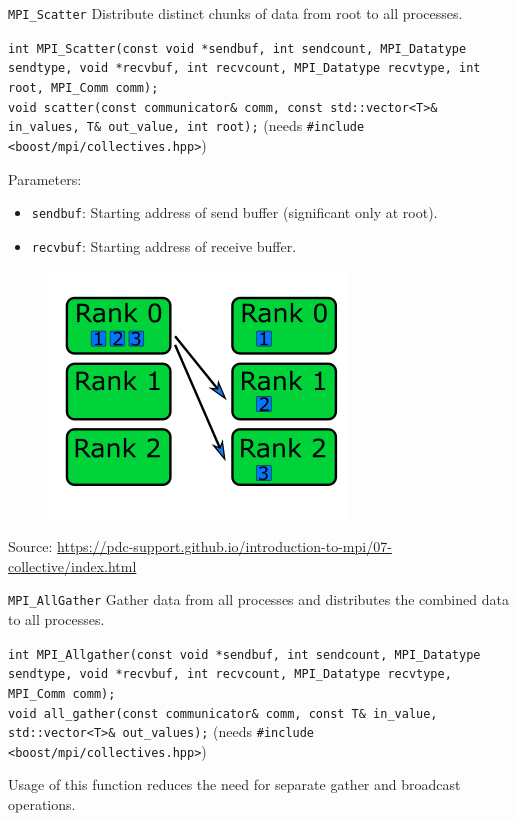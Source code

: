 \documentclass{beamer}
\begin{document}
\begin{frame}{\texttt{MPI\_Scatter}}
  Distribute distinct chunks of data from root to all processes.

  {
    \footnotesize
    \texttt{int MPI\_Scatter(const void *sendbuf, int sendcount, MPI\_Datatype sendtype, void *recvbuf, int recvcount, MPI\_Datatype recvtype, int root, MPI\_Comm comm);} \\
    \texttt{void scatter(const communicator\& comm, const std::vector<T>\& in\_values, T\& out\_value, int root);} (needs \texttt{\#include <boost/mpi/collectives.hpp>})
  }

  \begin{minipage}[t]{0.6\textwidth}
    Parameters:
    \begin{itemize}
      \item \texttt{sendbuf}: Starting address of send buffer (significant only at root).
      \item \texttt{recvbuf}: Starting address of receive buffer.
    \end{itemize}
  \end{minipage}
  \hfill
  \begin{minipage}[t]{0.35\textwidth}
    \begin{figure}[h]
      \includegraphics[]{images/scatter.png}
    \end{figure}
  \end{minipage}
  {\footnotesize Source: \href{https://pdc-support.github.io/introduction-to-mpi/07-collective/index.html}{https://pdc-support.github.io/introduction-to-mpi/07-collective/index.html}}
\end{frame}

\begin{frame}{\texttt{MPI\_AllGather}}
  Gather data from all processes and distributes the combined data to all processes.

  {
    \footnotesize
    \texttt{int MPI\_Allgather(const void *sendbuf, int sendcount, MPI\_Datatype sendtype, void *recvbuf, int recvcount, MPI\_Datatype recvtype, MPI\_Comm comm);} \\
    \texttt{void all\_gather(const communicator\& comm, const T\& in\_value, 
    std::vector<T>\& out\_values);} (needs \texttt{\#include <boost/mpi/collectives.hpp>})
  }

  Usage of this function reduces the need for separate gather and broadcast operations.
\end{frame}
\end{document}
